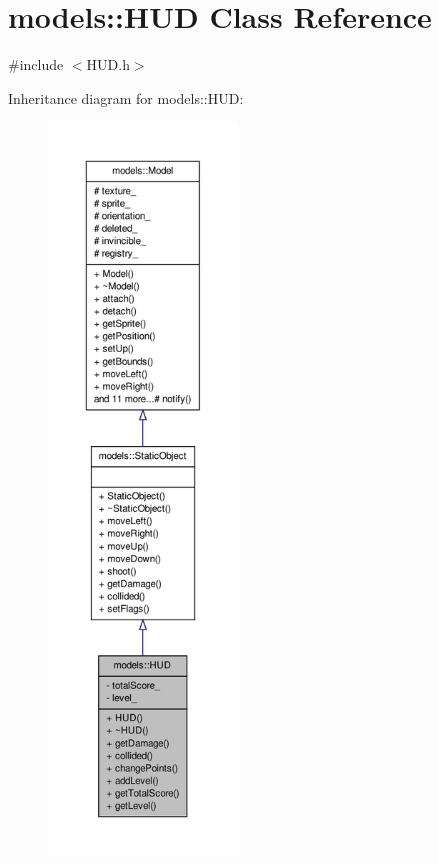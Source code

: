 \hypertarget{classmodels_1_1HUD}{\section{models\-:\-:\-H\-U\-D \-Class \-Reference}
\label{d6/dbb/classmodels_1_1HUD}
}


{\ttfamily \#include $<$\-H\-U\-D.\-h$>$}



\-Inheritance diagram for models\-:\-:\-H\-U\-D\-:
\nopagebreak
\begin{figure}[H]
\begin{center}
\leavevmode
\includegraphics[height=550pt]{d2/db9/classmodels_1_1HUD__inherit__graph}
\end{center}
\end{figure}


